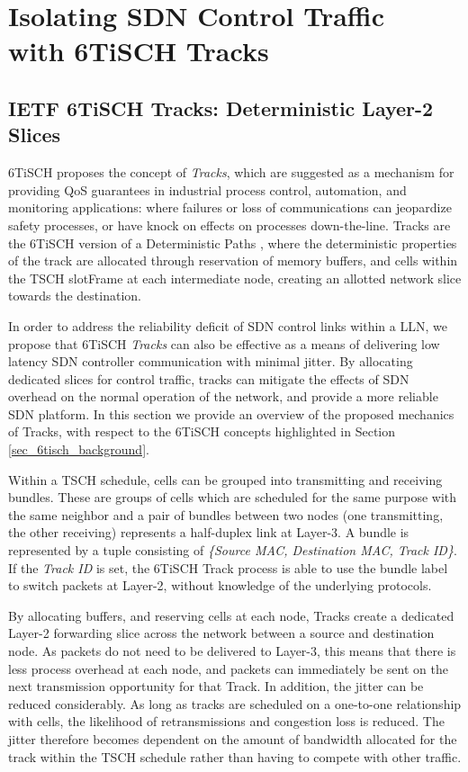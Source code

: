 
\section{Isolating SDN Control Traffic \\ with 6TiSCH Tracks}
\label{sec_motivation}

\subsection{IETF 6TiSCH Tracks: Deterministic Layer-2 Slices}

6TiSCH proposes the concept of \textit{Tracks}, which are suggested as a mechanism for providing QoS guarantees in industrial process control, automation, and monitoring applications: where failures or loss of communications can jeopardize safety processes, or have knock on effects on processes down-the-line. Tracks are the 6TiSCH version of a Deterministic Paths \cite{6tisch_ietf_architecture,ietf_detnet}, where the deterministic properties of the track are allocated through reservation of memory buffers, and cells within the TSCH slotFrame at each intermediate node, creating an allotted network slice towards the destination. 

In order to address the reliability deficit of SDN control links within a LLN, we propose that 6TiSCH \textit{Tracks} can also be effective as a means of delivering low latency SDN controller communication with minimal jitter. By allocating dedicated slices for control traffic, tracks can mitigate the effects of SDN overhead on the normal operation of the network, and provide a more reliable SDN platform. In this section we provide an overview of the proposed mechanics of Tracks, with respect to the 6TiSCH concepts highlighted in Section \ref{sec_6tisch_background}.

Within a TSCH schedule, cells can be grouped into transmitting and receiving bundles. These are groups of cells which are scheduled for the same purpose with the same neighbor and a pair of bundles between two nodes (one transmitting, the other receiving) represents a half-duplex link at Layer-3. A bundle is represented by a tuple consisting of \textit{\{Source MAC, Destination MAC, Track ID\}}. If the \textit{Track ID} is set, the 6TiSCH Track process is able to use the bundle label to switch packets at Layer-2, without knowledge of the underlying protocols. 

By allocating buffers, and reserving cells at each node, Tracks create a dedicated Layer-2 forwarding slice across the network between a source and destination node. As packets do not need to be delivered to Layer-3, this means that there is less process overhead at each node, and packets can immediately be sent on the next transmission opportunity for that Track. In addition,  the jitter can be reduced considerably. As long as tracks are scheduled on a one-to-one relationship with cells, the likelihood of retransmissions and congestion loss is reduced. The jitter therefore becomes dependent on the amount of bandwidth allocated for the track within the TSCH schedule rather than having to compete with other traffic.

